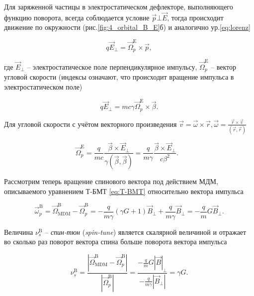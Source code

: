 \par Для заряженной частицы в электростатическом дефлекторе, выполняющего функцию поворота, всегда соблюдается условие $\vec{p} \bot \vec{E}$, тогда происходит движение по окружности (рис.\ref{fig:4_orbital_B_E}б) и аналогично ур.\ref{eq:lorenz}

\begin{equation}
q{\vec{E}}_\bot={\vec{\Omega}}_p^{\textrm{E}}\times\vec{p},
\end{equation} 

\noindent где ${\vec{E}}_\bot$ – электростатическое поле перпендикулярное импульсу, ${\vec{\Omega}}_p^{\textrm{E}}$ – вектор угловой скорости (индексы означают, что происходит вращение импульса в электростатическом поле)

\begin{equation}
q{\vec{E}}_\bot=mc\gamma{\vec{\Omega}}_p^{\textrm{E}}\times\vec{\beta}.
\end{equation} 

\noindent Для угловой скорости с учётом векторного произведения $\vec{v}=\vec{\omega}\times\vec{r}, \vec{\omega}=\frac{\vec{r}\times\vec{v}}{(\vec{r},\vec{r})}$

\begin{equation}
{\vec{\Omega}}_p^{\textrm{E}}=\frac{q}{mc}\frac{\vec{\beta}\times{\vec{E}}_\bot}{\gamma(\vec{\beta},\vec{\beta})}=\frac{q}{m\gamma}\frac{\vec{\beta}\times{\vec{E}}_\bot}{c\beta^2}.\ \ \ 
\label{eq:orbital_E}
\end{equation}

\par Рассмотрим теперь вращение спинового вектора под действием МДМ, описываемого уравнением Т-БМТ \ref{eq:T-BMT} относительно вектора импульса

\begin{equation}
{\vec{\omega}}_p^{\textrm{B}}={\vec{\Omega}}_{\textrm{MDM}}^\textrm{B}-{\vec{\Omega}}_p^{\textrm{B}}=-\frac{q}{m\gamma}\left(\gamma G+1\right){\vec{B}}_\bot+\frac{q}{m\gamma}{\vec{B}}_\bot=-\frac{q}{m}{G\vec{B}}_\bot.
\end{equation}

\noindent Величина $\nu_s^{\textrm{B}}$ -- \textit{спин-тюн} (\textit{spin-tune}) является скалярной величиной и отражает во сколько раз поворот вектора спина больше поворота вектора импульса

\begin{equation} 
\nu_s^{\textrm{B}}=\frac{\left|{\vec{\Omega}}_{\textrm{MDM}}^{\textrm{B}}-{\vec{\Omega}}_p^{\textrm{B}}\right|}{\left|{\vec{\Omega}}_p^{\textrm{B}}\right|}=\frac{-\frac{q}{m}{G\left|\vec{B}\right|}_\bot}{-\frac{q}{m\gamma}\left|{\vec{B}}_\bot\right|}=\gamma G.
\label{eq:spintune_B}
\end{equation}

